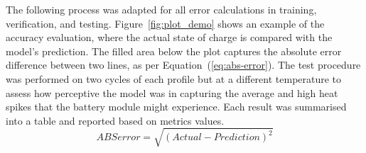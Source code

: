 %
The following process was adapted for all error calculations in training, verification, and testing.
Figure~\ref{fig:plot_demo} shows an example of the accuracy evaluation, where the actual state of charge is compared with the model's prediction.
The filled area below the plot captures the absolute error difference between two lines, as per Equation~(\ref{eq:abs-error}).
The test procedure was performed on two cycles of each profile but at a different temperature to assess how perceptive the model was in capturing the average and high heat spikes that the battery module might experience.
Each result was summarised into a table and reported based on metrics values.
\begin{equation}
    ABS error = \sqrt{(Actual-Prediction)^2}
    \label{eq:abs-error}
\end{equation}
%
%
%

